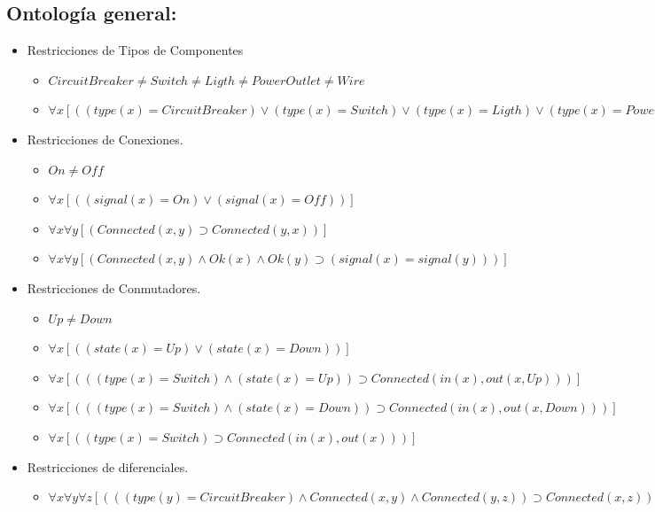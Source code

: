 \documentclass[10pt, a4paper,spanish]{article}
\begin{document}
		\subsection{Ontología general:}

			\begin{itemize}

				\item Restricciones de Tipos de Componentes
				\begin{itemize}
					\item $ CircuitBreaker \neq Switch\neq Ligth \neq PowerOutlet \neq Wire   $
					\item $ \forall x [((type(x) = CircuitBreaker) \lor (type(x) = Switch) \lor (type(x) = Ligth) \lor (type(x) = PowerOutlet) \lor (type(x) = Wire))] $
				\end{itemize}
				\item Restricciones de Conexiones.
				\begin{itemize}
					\item $ On \neq Off $
					\item $ \forall x [((signal(x) = On) \lor (signal(x) = Off))] $
					\item $ \forall x \forall y [(Connected(x, y) \supset Connected(y, x))] $
					\item $ \forall x \forall y [(Connected(x, y) \land Ok(x) \land Ok(y) \supset (signal(x) = signal(y)))] $
				\end{itemize}

				\item Restricciones de Conmutadores.
				\begin{itemize}
					\item $ Up \neq Down $
					\item $ \forall x [( (state(x) = Up) \lor (state(x) = Down))] $
					\item $ \forall x [( ( (type(x) = Switch) \land (state(x) = Up) ) \supset Connected(in(x), out(x, Up)))] $
					\item $ \forall x [( ( (type(x) = Switch) \land (state(x) = Down) ) \supset Connected(in(x), out(x, Down)))] $
					\item $ \forall x [( (type(x) = Switch)  \supset Connected(in(x), out(x)))] $
				\end{itemize}

				\item Restricciones de diferenciales.
				\begin{itemize}
					\item $ \forall x \forall y \forall z [( ((type(y) = CircuitBreaker) \land Connected(x, y) \land Connected(y, z) ) \supset Connected(x, z))] $
				\end{itemize}


\end{itemize}
\end{document}
